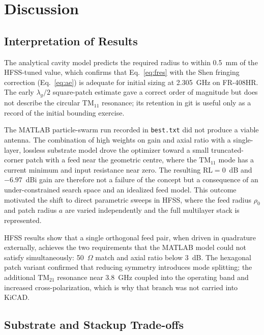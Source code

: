 %
%
%
%

\chapter{Discussion}

\section{Interpretation of Results}

The analytical cavity model predicts the required radius to within 0.5~mm of the HFSS-tuned value, which confirms that Eq.~\ref{eq:fres} with the Shen fringing correction (Eq.~\ref{eq:ae}) is adequate for initial sizing at 2.305~GHz on FR-408HR. The early $\lambda_g/2$ square-patch estimate gave a correct order of magnitude but does not describe the circular $\mathrm{TM}_{11}$ resonance; its retention in git is useful only as a record of the initial bounding exercise.

The MATLAB particle-swarm run recorded in \texttt{best.txt} did not produce a viable antenna. The combination of high weights on gain and axial ratio with a single-layer, lossless substrate model drove the optimizer toward a small truncated-corner patch with a feed near the geometric centre, where the $\mathrm{TM}_{11}$ mode has a current minimum and input resistance near zero. The resulting RL${}=0$~dB and $-6.97$~dBi gain are therefore not a failure of the concept but a consequence of an under-constrained search space and an idealized feed model. This outcome motivated the shift to direct parametric sweeps in HFSS, where the feed radius $\rho_0$ and patch radius $a$ are varied independently and the full multilayer stack is represented.

HFSS results show that a single orthogonal feed pair, when driven in quadrature externally, achieves the two requirements that the MATLAB model could not satisfy simultaneously: 50~$\Omega$ match and axial ratio below 3~dB. The hexagonal patch variant confirmed that reducing symmetry introduces mode splitting; the additional $\mathrm{TM}_{21}$ resonance near 3.8~GHz coupled into the operating band and increased cross-polarization, which is why that branch was not carried into KiCAD.

\section{Substrate and Stackup Trade-offs}


